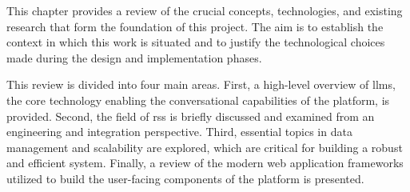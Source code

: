 This chapter provides a review of the crucial concepts, technologies, and existing research that form the foundation of this project. The aim is to establish the context in which this work is situated and to justify the technological choices made during the design and implementation phases.

This review is divided into four main areas. First, a high-level overview of \acp{llm}, the core technology enabling the conversational capabilities of the platform, is provided. Second, the field of \aclp{rs} is briefly discussed and examined from an engineering and integration perspective. Third, essential topics in data management and scalability are explored, which are critical for building a robust and efficient system. Finally, a review of the modern web application frameworks utilized to build the user-facing components of the platform is presented.